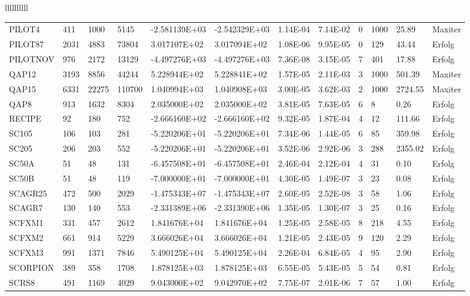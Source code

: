 \begin{tabular}{llllllllll}
\begin{tabular}{llllllllllll}
PILOT4 & 411 & 1000 & 5145 & -2.581139E+03 & -2.542329E+03 & 1.14E-04 & 7.14E-02 & 0 & 1000 & 25.89 & Maxiter \\
PILOT87 & 2031 & 4883 & 73804 & 3.017107E+02 & 3.017094E+02 & 1.08E-06 & 9.95E-05 & 0 & 129 & 43.44 & Erfolg \\
PILOTNOV & 976 & 2172 & 13129 & -4.497276E+03 & -4.497276E+03 & 7.36E-08 & 3.15E-05 & 7 & 401 & 17.88 & Erfolg \\
QAP12 & 3193 & 8856 & 44244 & 5.228944E+02 & 5.228841E+02 & 1.57E-05 & 2.11E-03 & 3 & 1000 & 501.39 & Maxiter \\
QAP15 & 6331 & 22275 & 110700 & 1.040994E+03 & 1.040908E+03 & 3.00E-05 & 3.62E-03 & 2 & 1000 & 2724.55 & Maxiter \\
QAP8 & 913 & 1632 & 8304 & 2.035000E+02 & 2.035000E+02 & 3.81E-05 & 7.63E-05 & 6 & 8 & 0.26 & Erfolg \\
RECIPE & 92 & 180 & 752 & -2.666160E+02 & -2.666160E+02 & 9.32E-05 & 1.87E-04 & 4 & 12 & 111.66 & Erfolg \\
SC105 & 106 & 103 & 281 & -5.220206E+01 & -5.220206E+01 & 7.34E-06 & 1.44E-05 & 6 & 85 & 359.98 & Erfolg \\
SC205 & 206 & 203 & 552 & -5.220206E+01 & -5.220206E+01 & 3.52E-06 & 2.92E-06 & 3 & 288 & 2355.02 & Erfolg \\
SC50A & 51 & 48 & 131 & -6.457508E+01 & -6.457508E+01 & 2.46E-04 & 2.12E-04 & 4 & 31 & 0.10 & Erfolg \\
SC50B & 51 & 48 & 119 & -7.000000E+01 & -7.000000E+01 & 4.30E-05 & 1.49E-07 & 3 & 23 & 0.08 & Erfolg \\
SCAGR25 & 472 & 500 & 2029 & -1.475343E+07 & -1.475343E+07 & 2.60E-05 & 2.52E-08 & 3 & 58 & 1.06 & Erfolg \\
SCAGR7 & 130 & 140 & 553 & -2.331389E+06 & -2.331390E+06 & 1.35E-05 & 1.30E-07 & 3 & 25 & 0.16 & Erfolg \\
SCFXM1 & 331 & 457 & 2612 & 1.841676E+04 & 1.841676E+04 & 1.25E-05 & 2.58E-05 & 8 & 218 & 4.55 & Erfolg \\
SCFXM2 & 661 & 914 & 5229 & 3.666026E+04 & 3.666026E+04 & 1.21E-05 & 2.43E-05 & 9 & 120 & 2.29 & Erfolg \\
SCFXM3 & 991 & 1371 & 7846 & 5.490125E+04 & 5.490125E+04 & 2.26E-04 & 6.84E-05 & 4 & 95 & 2.90 & Erfolg \\
SCORPION & 389 & 358 & 1708 & 1.878125E+03 & 1.878125E+03 & 6.55E-05 & 5.43E-05 & 5 & 54 & 0.81 & Erfolg \\
SCRS8 & 491 & 1169 & 4029 & 9.043000E+02 & 9.042970E+02 & 7.75E-07 & 2.01E-06 & 7 & 57 & 1.00 & Erfolg \\

\end{tabular}
\end{tabular}
